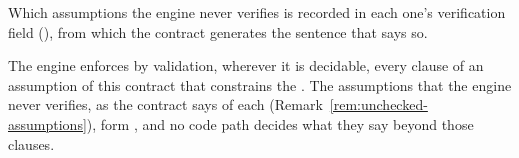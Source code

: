 
Which assumptions the engine never verifies is recorded in each one's
verification field
(),
from which the contract generates the sentence that says so.

\begin{requirement}\label{req:decidable-assumptions}
The engine enforces by validation, wherever it is decidable, every clause of
an assumption of this contract that constrains the . The
assumptions that the engine never verifies, as the contract says of each
(Remark~\ref{rem:unchecked-assumptions}), form ,
and no code path decides what they say beyond those clauses.
\end{requirement}
